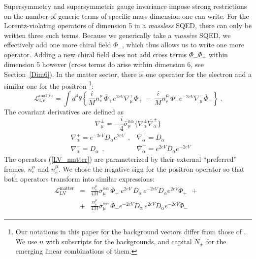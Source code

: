 \documentclass[a4paper,12pt]{article}
\begin{document}
	Supersymmetry and supersymmetric gauge invariance impose strong
	restrictions on the number of generic terms of specific mass
	dimension one can write.
	For the Lorentz-violating operators of dimension 5 in a 
	{\it massless} SQED, there can only be written three such terms.
	Because we generically take a {\it massive} SQED, we effectively
	add one more chiral field $ \Phi_- $, which thus allows us
	to write one more operator. 
	Adding a new chiral field does not add cross terms 
	$ \Phi_- \Phi_+ $ 
	within dimension 5 however
	(cross terms do arise within dimension 6, see 
	Section~\ref{Dim6}).
	In the matter sector, there is one operator for the electron and 
	a similar one for the positron
\footnote{
	Our notations in this paper for the background vectors differ
	from those of 
\cite{GrootNibbelink:2004za}.
	We use $ n $ with subscripts for the backgrounds, and 
	capital $ N_\pm $ for the emerging linear combinations of 
	them.}:
\begin{equation}
\label{LV_matter}
  \mathcal{L}_{\mathrm{LV}}^{\mathrm{matter}} = 
  \int d^4\theta \left\{ 
           \frac{i}{M} n_e^\mu\, \overline{\Phi}_+ e^{2eV} \nabla^+_\mu 
	                                                   \Phi_+ ~
	-~ \frac{i}{M} n_{\bar{e}}^\mu\, 
                          \Phi_- e^{-2eV} \nabla^-_\mu 
			  \overline{\Phi}_-
                 \right\}~.
\end{equation}
	The covariant derivatives are defined as
\[
          \nabla^\pm_\mu = - \frac{i}
                                  {4} \bar{\sigma}_\mu^{\dot{\alpha}\alpha}
	  	  \{ \nabla^\pm_\alpha 
		      \overline{\nabla}^\pm_{\dot{\alpha}} \} 
\]
\begin{eqnarray*}
        & \nabla^+_\alpha = e^{-2eV} D_\alpha e^{2eV}~~,
        & \overline{\nabla}^+_{\dot{\alpha}} = \overline{D}_{\dot{\alpha}} \\
        & \nabla^-_\alpha = D_\alpha~~,~~~~~~~~~~~~
        & \overline{\nabla}^-_{\dot{\alpha}} = e^{2eV} \overline{D}_{\dot{\alpha}}
                                    e^{-2eV}
\end{eqnarray*}
	The operators 
  (\ref{LV_matter})
	are parameterized by their external ``preferred''
	frames, $ n_e^\mu $ and $ n_{\bar{e}}^\mu $. 
	We chose the negative sign for the positron operator so that
	both operators transform into similar expressions:
\begin{eqnarray*}
	\mathcal{L}_{\mathrm{LV}}^{\mathrm{matter}} & = 
  & {\displaystyle 
      \frac{n_e^\mu}
           {4 M}}
                   \overline{\sigma}_\mu^{\dot{\alpha}\alpha} \,
	           \overline{\Phi}_+ ~e^{2eV}\,\overline{D}_{\dot{\alpha}}\,
		    e^{-2eV} D_{\alpha} e^{2eV} \Phi_+ ~~+~~ \\
 & + & {\displaystyle
      \frac{n_{\bar{e}}^\mu}
           {4 M}}
                   \overline{\sigma}_\mu^{\dot{\alpha}\alpha} \,
                   \overline{\Phi}_- e^{-2eV} \overline{D}_{\dot{\alpha}}\,
                   e^{2eV} D_{\alpha} e^{-2eV} \Phi_- 
\end{eqnarray*}
\end{document}
